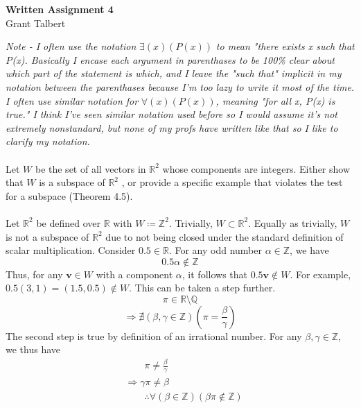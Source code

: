 \documentclass{article}
\begin{document}
\large

\thispagestyle{fancy}
\pagestyle{fancy}
\begin{center}
\textbf{Written Assignment 4}\\
Grant Talbert
\end{center}
\emph{Note - I often use the notation }\(\exists (x)(P(x))\)\emph{ to mean "there exists x such that P(x). Basically I encase each argument in parenthases to be 100\% clear about which part of the statement is which, and I leave the "such that" implicit in my notation between the parenthases because I'm too lazy to write it most of the time. I often use similar notation for }\(\forall(x)(P(x)) \)\emph{, meaning "for all x, P(x) is true." I think I've seen similar notation used before so I would assume it's not extremely nonstandard, but none of my profs have written like that so I like to clarify my notation.}\\
\noindent\makebox[\linewidth]{\rule{\linewidth}{0.4pt}}\\
 Let $W$ be the set of all vectors in $\mathbb{R}^2$ whose components are integers.  Either show that  $W$ is a subspace of $\mathbb{R}^2$ , or provide a specific example that violates the test for a subspace (Theorem 4.5).\\
\noindent\makebox[\linewidth]{\rule{\linewidth}{0.4pt}}\\
Let \(\mathbb{R} ^2\) be defined over \(\mathbb{R} \) with \(W\coloneqq \mathbb{Z} ^2\). Trivially, \(W \subset  \mathbb{R} ^2\). Equally as trivially, \(W\) is not a subspace of \(\mathbb{R} ^2\) due to not being closed under the standard definition of scalar multiplication. Consider \(0.5\in\mathbb{R} \). For any odd number \(\alpha  \in\mathbb{Z} \), we have 
\[
  0.5 \alpha  \notin \mathbb{Z}
\]
Thus, for any \(\mathbf{v}\in W\) with a component \(\alpha \), it follows that \(0.5\mathbf{v} \notin W\). For example, \(0.5(3,1)=(1.5,0.5)\notin W\). This can be taken a step further.
\[
  \pi \in\mathbb{R} \setminus \mathbb{Q} 
\]
\[
  \Longrightarrow \nexists(\beta ,\gamma \in\mathbb{Z} )\left( \pi =\frac{\beta }{\gamma } \right) 
\]
The second step is true by definition of an irrational number. For any \(\beta ,\gamma \in \mathbb{Z} \), we thus have 
\begin{align*}
  &\qquad\pi \neq \frac{\beta }{\gamma }\\
  &\Longrightarrow \gamma \pi \neq \beta\\
  &\qquad\therefore \forall \left( \beta \in\mathbb{Z}  \right)\left( \beta  \pi \notin\mathbb{Z}   \right)
\end{align*}
\end{document}
